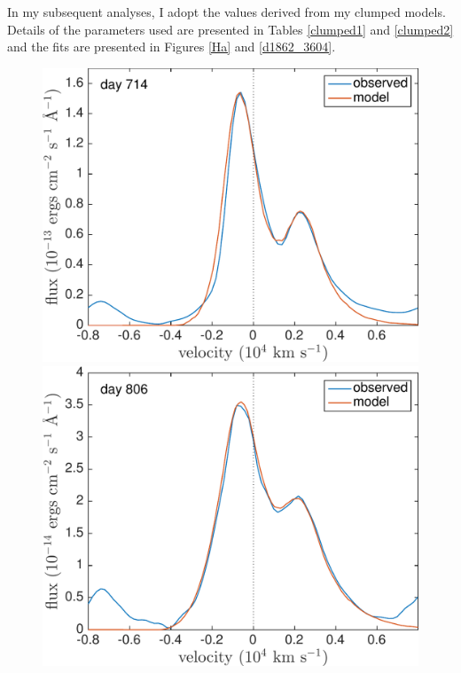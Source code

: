 In my subsequent analyses, I adopt the values derived from my clumped 
models.  Details of the parameters used are presented in 
Tables \ref{clumped1} and \ref{clumped2} and the fits are presented in Figures 
\ref{Ha} and \ref{d1862_3604}.

\begin{figure}
\centering

\includegraphics[trim =0 25 0 0,clip=true,scale=0.4]{chapters/chapter5/images/smooth/best_fit/d714OI.pdf}
\hspace{1mm}
\includegraphics[trim =25 25 0 0,clip=true,scale=0.4]{chapters/chapter5/images/smooth/best_fit/d806OI_ext.pdf}


\end{figure}
